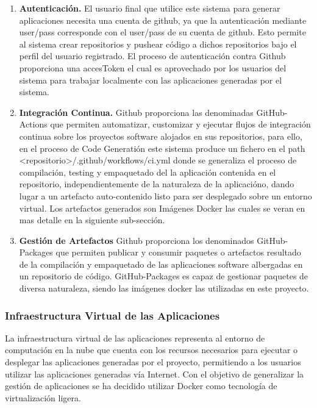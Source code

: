 \documentclass[a4paper,11pt]{book}
\begin{document}
\begin{enumerate}
\item \textbf{ Autenticación.} El usuario final que utilice este sistema para generar aplicaciones necesita una cuenta de github, ya que la autenticación mediante user/pass corresponde con el user/pass de su cuenta de github. Esto permite al sistema crear repositorios y pushear código a dichos repositorios bajo el perfil del usuario registrado. El proceso de autenticación contra Github proporciona una accesToken el cual es aprovechado por los usuarios del sistema para trabajar localmente con las aplicaciones generadas por el sistema. 

\item   \textbf{Integración Continua.} Github proporciona las denominadas GitHub-Actions\cite{github3}  que permiten automatizar, customizar y ejecutar flujos de integración continua  sobre los proyectos software alojados en sus repositorios, para ello, en el proceso de Code Generatión este sistema produce un fichero  en el path  <repositorio>/.github/workflows/ci.yml donde se generaliza el proceso de compilación, testing y empaquetado del la aplicación contenida en el repositorio, independientemente de la naturaleza de la aplicacióno, dando lugar a un artefacto auto-contenido listo para ser desplegado sobre un entorno virtual. Los artefactos generados son Imágenes Docker las cuales se veran en mas detalle en la siguiente sub-sección.  

\item \textbf{Gestión de Artefactos} Github proporciona los denominados GitHub-Packages\cite{github4} que permiten publicar y consumir paquetes o artefactos resultado de la compilación y empaquetado de las aplicaciones software albergadas en un repositorio de código. GitHub-Packages es capaz de gestionar paquetes de diversa naturaleza, siendo las imágenes docker las utilizadas en este proyecto. 
\end{enumerate}   

\subsubsection{Infraestructura Virtual de las Aplicaciones}

La infraestructura virtual de las aplicaciones  representa al entorno de computación en la nube que cuenta con los recursos necesarios para ejecutar o desplegar las aplicaciones generadas por el proyecto, permitiendo a los usuarios utilizar las aplicaciones generadas vía Internet.
Con el objetivo de generalizar la gestión de aplicaciones  se ha decidido utilizar Docker como tecnología de virtualización ligera.  
\end{document}
